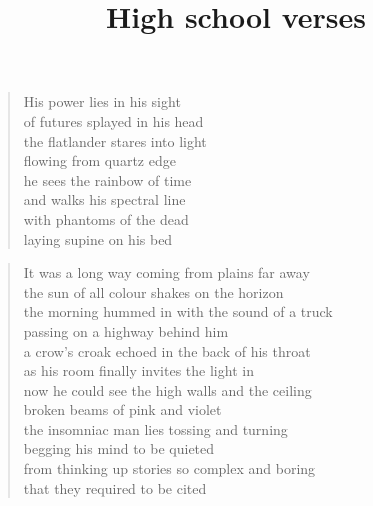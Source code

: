 \documentclass[12pt,a4paper]{article}
\title{\vspace{-3cm} High school verses }
\date{}
\begin{document}
\maketitle
\vspace{-1cm}
\begin{verse}
His power lies in his sight \\
of futures splayed in his head \\
the flatlander stares into light \\
flowing from quartz edge \\
he sees the rainbow of time \\
and walks his spectral line \\
with phantoms of the dead \\
laying supine on his bed \\
\end{verse}

\begin{verse}
It was a long way coming from plains far away \\
the sun of all colour shakes on the horizon \\
the morning hummed in with the sound of a truck \\
passing on a highway behind him \\
a crow’s croak echoed in the back of his throat \\
as his room finally invites the light in \\ 
now he could see the high walls and the ceiling \\
broken beams of pink and violet \\
the insomniac man lies tossing and turning \\
begging his mind to be quieted \\ 
from thinking up stories so complex and boring \\
that they required to be cited \\
\end{verse}
\end{document}
